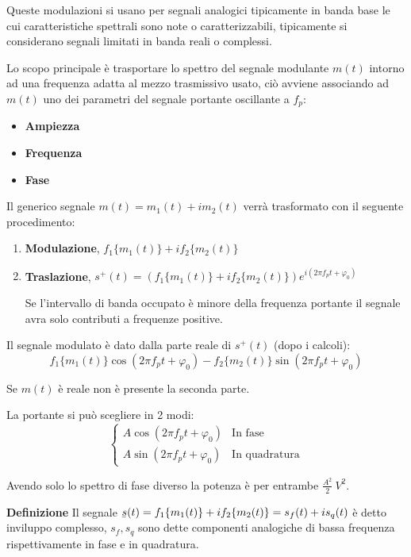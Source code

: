 \documentclass{article}
\newcommand{\df}{\noindent\textbf{Definizione} }
\newcommand{\ubar}[1]{\underaccent{\bar}{#1}}
\begin{document}
Queste modulazioni si usano per segnali analogici tipicamente in banda base le cui caratteristiche spettrali sono note o caratterizzabili, tipicamente si considerano segnali limitati in banda reali o complessi.\newline

\noindent Lo scopo principale è trasportare lo spettro del segnale modulante $m(t)$ intorno ad una frequenza adatta al mezzo trasmissivo usato, ciò avviene associando ad $m(t)$ uno dei parametri del segnale portante oscillante a $f_p$:
\begin{itemize}
    \item \textbf{Ampiezza}
    \item \textbf{Frequenza}
    \item \textbf{Fase}\newline
\end{itemize}

\noindent Il generico segnale $m(t)=m_1(t)+im_2(t)$ verrà trasformato con il seguente procedimento:
\begin{enumerate}
    \item \textbf{Modulazione}, $f_1\{m_1(t)\}+if_2\{m_2(t)\}$
    \item \textbf{Traslazione}, $s^+(t)=(f_1\{m_1(t)\}+if_2\{m_2(t)\})e^{i(2\pi f_pt+\varphi_0)}$

        Se l'intervallo di banda occupato è minore della frequenza portante il segnale avra solo contributi a frequenze positive.\newline
\end{enumerate}

\noindent Il segnale modulato è dato dalla parte reale di $s^+(t)$ (dopo i calcoli):
$$f_1\{m_1(t)\}\cos(2\pi f_pt+\varphi_0)-f_2\{m_2(t)\}\sin(2\pi f_pt+\varphi_0)$$

\noindent Se $m(t)$ è reale non è presente la seconda parte.\newline

\noindent La portante si può scegliere in 2 modi:
\[\begin{cases}
    A\cos(2\pi f_pt+\varphi_0) & \text{In fase}\\
    A\sin(2\pi f_pt+\varphi_0) & \text{In quadratura}
\end{cases}\]

\noindent Avendo solo lo spettro di fase diverso la potenza è per entrambe $\frac{A^2}{2}\ V^2$.\newline

\df Il segnale $\ubar{s}(t)=f_1\{m_1(t)\}+if_2\{m_2(t)\}=s_f(t)+is_q(t)$ è detto inviluppo complesso, $s_f,s_q$ sono dette componenti analogiche di bassa frequenza rispettivamente in
fase e in quadratura.\newline
\end{document}

